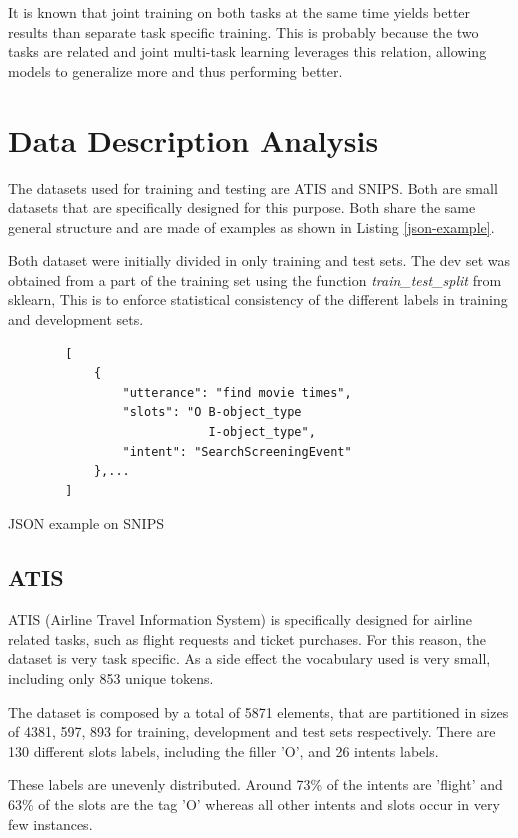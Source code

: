 \documentclass[a4paper]{article}
\begin{document}
\begin{itemize}
\end{itemize}

It is known that joint training on both tasks at the same time yields better results than separate task specific training. This is probably because the two tasks are related and joint multi-task learning leverages this relation, allowing models to generalize more and thus performing better.

\section{Data Description  Analysis}

The datasets used for training and testing are ATIS and SNIPS. Both are small datasets that are specifically designed for this purpose. Both share the same general structure and are made of examples as shown in Listing \ref{json-example}.

Both dataset were initially divided in only training and test sets. The dev set was obtained from a part of the training set using the function \emph{train\_test\_split} from sklearn, This is to enforce statistical consistency of the different labels in training and development sets. 
\begin{listing}[h!]
	\begin{verbatim}
		[
			{     
				"utterance": "find movie times",
				"slots": "O B-object_type 
							I-object_type",
				"intent": "SearchScreeningEvent"
			},...
		]
	\end{verbatim}
	\caption{JSON example on SNIPS} 
	\label{json-example}
\end{listing}


\subsection{ATIS}
ATIS (Airline Travel Information System) is specifically designed for airline related tasks, such as flight requests and ticket purchases. For this reason, the dataset is very task specific. As a side effect the vocabulary used is very small, including only 853 unique tokens. 

The dataset is composed by a total of 5871 elements, that are partitioned in sizes of 4381, 597, 893 for training, development and test sets respectively. There are 130 different slots labels, including the filler 'O', and 26 intents labels.  

These labels are unevenly distributed. Around 73\% of the intents are 'flight' and 63\% of the slots are the tag 'O' whereas all other intents and slots occur in very few instances. 
\end{document}

